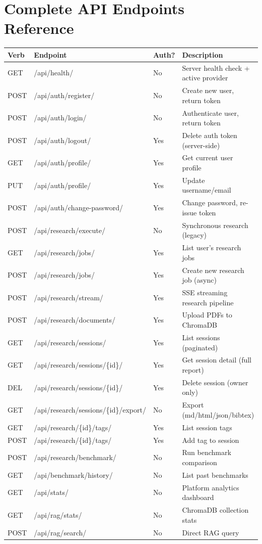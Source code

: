 \documentclass[11pt,a4paper,twoside]{report}
\begin{document}
\section{Complete API Endpoints Reference}

\begin{longtable}{|p{1cm}|p{4.5cm}|p{1.5cm}|p{6cm}|}
\hline
\textbf{Verb} & \textbf{Endpoint} & \textbf{Auth?} & \textbf{Description} \\
\hline
\endhead
GET & /api/health/ & No & Server health check + active provider \\
\hline
POST & /api/auth/register/ & No & Create new user, return token \\
\hline
POST & /api/auth/login/ & No & Authenticate user, return token \\
\hline
POST & /api/auth/logout/ & Yes & Delete auth token (server-side) \\
\hline
GET & /api/auth/profile/ & Yes & Get current user profile \\
\hline
PUT & /api/auth/profile/ & Yes & Update username/email \\
\hline
POST & /api/auth/change-password/ & Yes & Change password, re-issue token \\
\hline
POST & /api/research/execute/ & No & Synchronous research (legacy) \\
\hline
GET & /api/research/jobs/ & Yes & List user's research jobs \\
\hline
POST & /api/research/jobs/ & Yes & Create new research job (async) \\
\hline
POST & /api/research/stream/ & Yes & SSE streaming research pipeline \\
\hline
POST & /api/research/documents/ & Yes & Upload PDFs to ChromaDB \\
\hline
GET & /api/research/sessions/ & Yes & List sessions (paginated) \\
\hline
GET & /api/research/sessions/\{id\}/ & Yes & Get session detail (full report) \\
\hline
DEL & /api/research/sessions/\{id\}/ & Yes & Delete session (owner only) \\
\hline
GET & /api/research/sessions/\{id\}/export/ & No & Export (md/html/json/bibtex) \\
\hline
GET & /api/research/\{id\}/tags/ & Yes & List session tags \\
\hline
POST & /api/research/\{id\}/tags/ & Yes & Add tag to session \\
\hline
POST & /api/research/benchmark/ & No & Run benchmark comparison \\
\hline
GET & /api/benchmark/history/ & No & List past benchmarks \\
\hline
GET & /api/stats/ & No & Platform analytics dashboard \\
\hline
GET & /api/rag/stats/ & No & ChromaDB collection stats \\
\hline
POST & /api/rag/search/ & No & Direct RAG query \\
\hline
\end{longtable}
\end{document}
